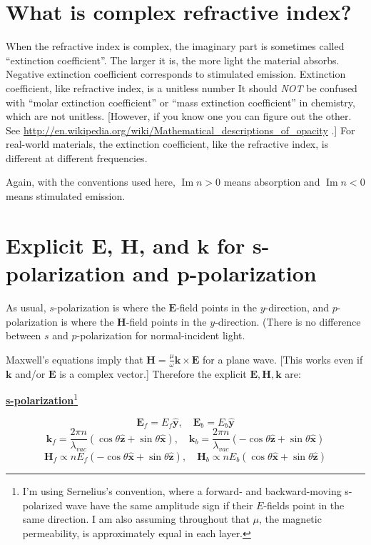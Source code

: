 \documentclass[12pt]{article}
\renewcommand{\(}{\left(}
\renewcommand{\)}{\right)}
\renewcommand{\Im}{\operatorname{Im}}
\newcommand{\E}{\mathbf{E}}
\renewcommand{\H}{\mathbf{H}}
\renewcommand{\k}{\mathbf{k}}
\newcommand{\x}{\hat{\mathbf{x}}}
\newcommand{\y}{\hat{\mathbf{y}}}
\newcommand{\z}{\hat{\mathbf{z}}}
\begin{document}
\section{What is complex refractive index?}

When the refractive index is complex, the imaginary part is sometimes called ``extinction coefficient''. The larger it is, the more light the material absorbs. Negative extinction coefficient corresponds to stimulated emission. Extinction coefficient, like refractive index, is a unitless number It should \emph{NOT} be confused with ``molar extinction coefficient'' or ``mass extinction coefficient'' in chemistry, which are not unitless. [However, if you know one you can figure out the other. See \url{http://en.wikipedia.org/wiki/Mathematical_descriptions_of_opacity} .] For real-world materials, the extinction coefficient, like the refractive index, is different at different frequencies.

Again, with the conventions used here, $\Im n>0$ means absorption and $\Im n<0$ means stimulated emission.

\section{Explicit $\E$, $\H$, and $\k$ for s-polarization and p-polarization}

As usual, $s$-polarization is where the $\E$-field points in the $y$-direction, and $p$-polarization is where the $\H$-field points in the $y$-direction. (There is no difference between $s$ and $p$-polarization for normal-incident light.

Maxwell's equations imply that $\H = \frac{\mu}{\omega}\k \times \E$ for a plane wave. [This works even if $\k$ and/or $\E$ is a complex vector.] Therefore the explicit $\E,\H,\k$ are:

\begin{center} {\bf \underline{s-polarization}}\footnote{I'm using Sernelius's convention, where a forward- and backward-moving s-polarized wave have the same amplitude sign if their $E$-fields point in the same direction. I am also assuming throughout that $\mu$, the magnetic permeability, is approximately equal in each layer.}
 \end{center}
$$\E_f = E_f \y, \quad \E_b = E_b \y$$
$$\k_f =\frac{2\pi n}{\lambda_{vac}}\( \cos \theta \z + \sin \theta \x\), \quad \k_b = \frac{2\pi n}{\lambda_{vac}}\(- \cos \theta \z + \sin \theta \x\)$$
$$\H_f \propto  n E_f \( - \cos \theta \x +  \sin \theta \z\), \quad \H_b \propto n E_b\( \cos \theta \x + \sin \theta \z\)$$
\end{document}
